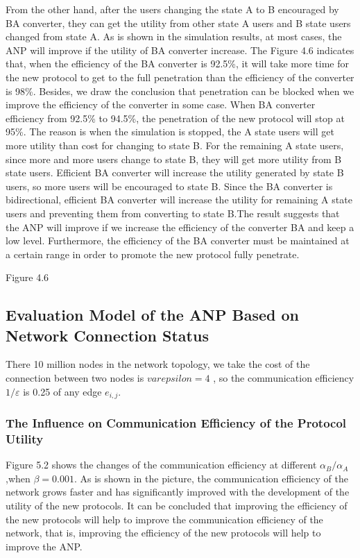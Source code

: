 \documentclass{article}
\begin{document}
From the other hand, after the users changing the state A to B encouraged by BA converter, they can get the utility
from other state A users and  B state users changed from state A. As is shown in the simulation results, at most cases,
the ANP will improve if the utility of BA converter increase. The Figure 4.6 indicates that, when the efficiency of
the BA converter is 92.5\%, it will take more time for the new protocol to get to the full penetration than the
efficiency of the converter is 98\%. Besides, we draw the conclusion that penetration can be blocked when we improve
the efficiency of the converter in some case. When BA converter efficiency from 92.5\% to 94.5\%,  the penetration
of the new protocol will stop at 95\%. The reason is when the simulation is stopped, the A state users will get more
utility than cost for changing to state B. For the remaining A state users, since more and more users change to state B,
they will get more utility from B state users. Efficient BA converter will increase the utility generated by state B
users, so more users will be encouraged to state B. Since the BA converter is bidirectional, efficient BA converter
will increase the utility for remaining A state users and preventing them from converting to state B.The result suggests
that the ANP will improve if we increase the efficiency of the converter BA and keep a low level. Furthermore, the
efficiency of the BA converter must be maintained at a certain range in order to promote the new protocol fully penetrate.

Figure 4.6

\subsection{Evaluation Model of the ANP Based on Network Connection Status}
There 10 million nodes in the network topology, we take the cost of the connection between two nodes is $varepsilon=4$ ,
so the communication efficiency $1/\varepsilon$ is 0.25 of any edge $e_{i,j}$.
\subsubsection{The Influence on Communication Efficiency  of the Protocol Utility}
Figure 5.2 shows the changes of the communication efficiency at different $\alpha_B/\alpha_A$,when $\beta=0.001$. As is
shown in the picture, the communication efficiency of the network grows faster and has significantly improved with the
development of the utility of the new protocols. It can be concluded that improving the efficiency of the new protocols
will help to improve the communication efficiency of the network, that is, improving the efficiency of the new protocols
will help to improve the ANP.
\end{document}
